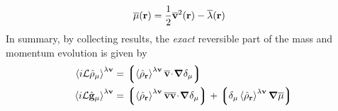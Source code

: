 \documentclass[b5paper,openright,10pt]{book}
\newcommand{\esc}{\!\cdot\!}
\newcommand{\llangle}{\left\langle}
\newcommand{\rrangle}{\right\rangle}
\newcommand{\llg}{\left\lgroup}
\newcommand{\rlg}{\right\rgroup}
\begin{document}
\begin{appendices}
\begin{align}
  \overline{\mu}({\bf r}) &=\frac{1}{2}\overline{\bf v}^2({\bf r})-\overline{\lambda}({\bf r})
\label{mufield}
\end{align}
In summary, by collecting results, the \textit{exact} reversible part of the mass and
momentum evolution is given by
\begin{align}
  \llangle i{\cal L}\hat{\rho}_\mu\rrangle^{\lambda{\bf v}} &=
  \llg\llangle \hat{\rho}_{\bf r}\rrangle^{\lambda{\bf v}}
\overline{\bf v}\esc\boldsymbol{\nabla}\delta_{\mu}\rlg
\nonumber\\
  \llangle i{\cal L}\hat{\bf g}_\mu\rrangle^{\lambda{\bf v}} &=
\llg\llangle \hat{\rho}_{\bf r}\rrangle^{\lambda{\bf v}}
\overline{\bf v}\overline{\bf v}\esc\boldsymbol{\nabla}\delta_{\mu}\rlg
+\llg\delta_\mu\llangle\hat{\rho}_{\bf r}\rrangle^{\lambda{\bf v}}\boldsymbol{\nabla}\overline{\mu}\rlg
\label{RevExact}
\end{align}



\end{appendices}
\end{document}
